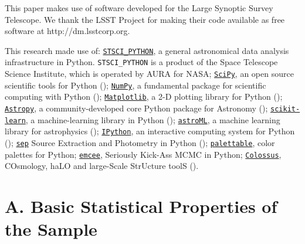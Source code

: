 \documentclass{emulateapj}
\begin{document}
\begin{CJK*}{UTF8}{gbsn}
  This paper makes use of software developed for the Large Synoptic Survey 
  Telescope. We thank the LSST Project for making their code available as free 
  software at http://dm.lsstcorp.org.
 
  This research made use of:
  \href{http://www.stsci.edu/institute/software_hardware/pyraf/stsci\_python}{\texttt{STSCI\_PYTHON}},
      a general astronomical data analysis infrastructure in Python. 
      \texttt{STSCI\_PYTHON} is a product of the Space Telescope Science Institute, 
      which is operated by AURA for NASA;
  \href{http://www.scipy.org/}{\texttt{SciPy}},
      an open source scientific tools for Python (\citealt{SciPy});
  \href{http://www.numpy.org/}{\texttt{NumPy}}, 
      a fundamental package for scientific computing with Python (\citealt{NumPy});
  \href{http://matplotlib.org/}{\texttt{Matplotlib}}, 
      a 2-D plotting library for Python (\citealt{Matplotlib});
  \href{http://www.astropy.org/}{\texttt{Astropy}}, a community-developed 
      core Python package for Astronomy (\citealt{AstroPy}); 
  \href{http://scikit-learn.org/stable/index.html}{\texttt{scikit-learn}},
      a machine-learning library in Python (\citealt{scikit-learn}); 
  \href{http://www.astroml.org/}{\texttt{astroML}}, 
      a machine learning library for astrophysics (\citealt{astroML});
  \href{https://ipython.org}{\texttt{IPython}}, 
      an interactive computing system for Python (\citealt{IPython});
  \href{https://github.com/kbarbary/sep}{\texttt{sep}} 
      Source Extraction and Photometry in Python (\citealt{PythonSEP});
  \href{https://jiffyclub.github.io/palettable/}{\texttt{palettable}},
      color palettes for Python;
  \href{http://dan.iel.fm/emcee/current/}{\texttt{emcee}}, 
      Seriously Kick-Ass MCMC in Python;
  \href{http://bdiemer.bitbucket.org/}{\texttt{Colossus}}, 
      COsmology, haLO and large-Scale StrUcture toolS (\citealt{Colossus}).





\appendix


\section{A. Basic Statistical Properties of the Sample} 
	\label{app:basic}
    

\end{CJK*}
\end{document}
